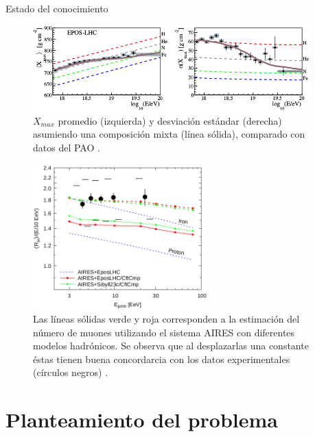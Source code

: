 \documentclass[10pt]{beamer}
\begin{document}
\begin{frame}{Estado del conocimiento}
\begin{figure}
\centering
\includegraphics[width=0.95\textwidth]{Figuras/Xmax_PAO} 
\caption{$X_{max}$ promedio (izquierda) y desviación estándar (derecha) asumiendo una composición mixta (línea sólida), comparado con datos del PAO \cite{PAOcomposition}.}
\label{fig:Xmax}
\end{figure}	
\end{frame}

\begin{frame}
\begin{figure}
\centering
\includegraphics[width=0.6\textwidth]{Figuras/Nmu_Sciutto} 
\caption{Las líneas sólidas verde y roja corresponden a la estimación del número de muones utilizando el sistema AIRES con diferentes modelos hadrónicos. Se observa que al desplazarlas una constante éstas tienen buena concordarcia con los datos experimentales (círculos negros) \cite{Sciutto2019}.}
\label{fig:Nmu}
\end{figure}	
\end{frame}

\section{Planteamiento del problema}
\end{document}
